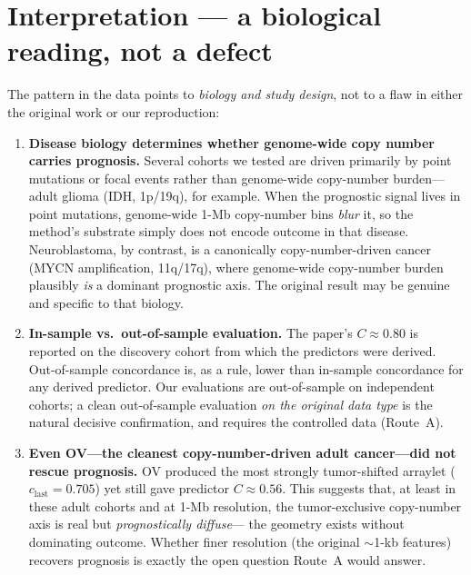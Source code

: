 \documentclass[11pt]{article}
\begin{document}
\section{Interpretation --- a biological reading, not a defect}

The pattern in the data points to \emph{biology and study design}, not to a flaw
in either the original work or our reproduction:

\begin{enumerate}[leftmargin=*]
  \item \textbf{Disease biology determines whether genome-wide copy number
    carries prognosis.} Several cohorts we tested are driven primarily by point
    mutations or focal events rather than genome-wide copy-number burden---adult
    glioma (IDH, 1p/19q), for example. When the prognostic signal lives in point
    mutations, genome-wide 1-Mb copy-number bins \emph{blur} it, so the method's
    substrate simply does not encode outcome in that disease. Neuroblastoma, by
    contrast, is a canonically copy-number-driven cancer (MYCN amplification,
    11q/17q), where genome-wide copy-number burden plausibly \emph{is} a dominant
    prognostic axis. The original result may be genuine and specific to that
    biology.
  \item \textbf{In-sample vs.\ out-of-sample evaluation.} The paper's $C \approx
    0.80$ is reported on the discovery cohort from which the predictors were
    derived. Out-of-sample concordance is, as a rule, lower than in-sample
    concordance for any derived predictor. Our evaluations are out-of-sample on
    independent cohorts; a clean out-of-sample evaluation \emph{on the original
    data type} is the natural decisive confirmation, and requires the controlled
    data (Route~A).
  \item \textbf{Even OV---the cleanest copy-number-driven adult cancer---did not
    rescue prognosis.} OV produced the most strongly tumor-shifted arraylet
    ($c_{\text{last}} = 0.705$) yet still gave predictor $C \approx 0.56$. This
    suggests that, at least in these adult cohorts and at 1-Mb resolution, the
    tumor-exclusive copy-number axis is real but \emph{prognostically diffuse}---
    the geometry exists without dominating outcome. Whether finer resolution
    (the original $\sim$1-kb features) recovers prognosis is exactly the open
    question Route~A would answer.
\end{enumerate}
\end{document}
